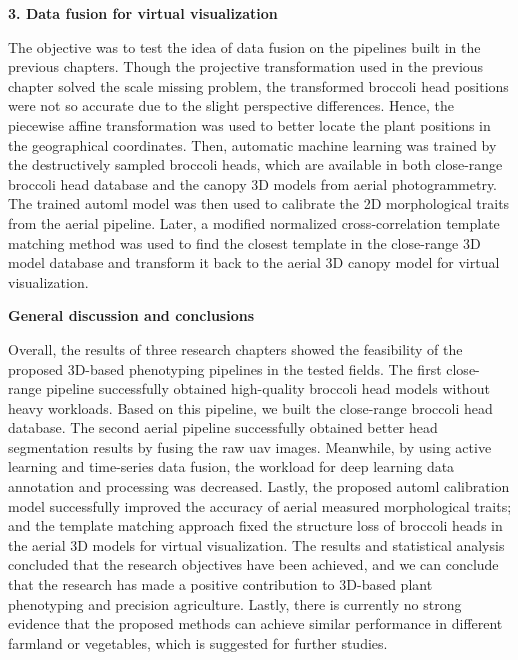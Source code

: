 \begin{doublespace}
\vspace{5mm}
\noindent
\textbf{3. Data fusion for virtual visualization}

The objective was to test the idea of data fusion on the pipelines built in the previous chapters. Though the projective transformation used in the previous chapter solved the scale missing problem, the transformed broccoli head positions were not so accurate due to the slight perspective differences. Hence, the piecewise affine transformation was used to better locate the plant positions in the geographical coordinates. Then, automatic machine learning was trained by the destructively sampled broccoli heads, which are available in both close-range broccoli head database and the canopy 3D models from aerial photogrammetry. The trained \gls{automl} model was then used to calibrate the 2D morphological traits from the aerial pipeline. Later, a modified normalized cross-correlation template matching method was used to find the closest template in the close-range 3D model database and transform it back to the aerial 3D canopy model for virtual visualization.

\vspace{5mm}
\noindent
\textbf{General discussion and conclusions}


Overall, the results of three research chapters showed the feasibility of the proposed 3D-based phenotyping pipelines in the tested fields. The first close-range pipeline successfully obtained high-quality broccoli head models without heavy workloads. Based on this pipeline, we built the close-range broccoli head database. The second aerial pipeline successfully obtained better head segmentation results by fusing the raw \gls{uav} images. Meanwhile, by using active learning and time-series data fusion, the workload for deep learning data annotation and processing was decreased. Lastly, the proposed \gls{automl} calibration model successfully improved the accuracy of aerial measured morphological traits; and the template matching approach fixed the structure loss of broccoli heads in the aerial 3D models for virtual visualization. The results and statistical analysis concluded that the research objectives have been achieved, and we can conclude that the research has made a positive contribution to 3D-based plant phenotyping and precision agriculture. Lastly, there is currently no strong evidence that the proposed methods can achieve similar performance in different farmland or vegetables, which is suggested for further studies.

\end{doublespace}
  

